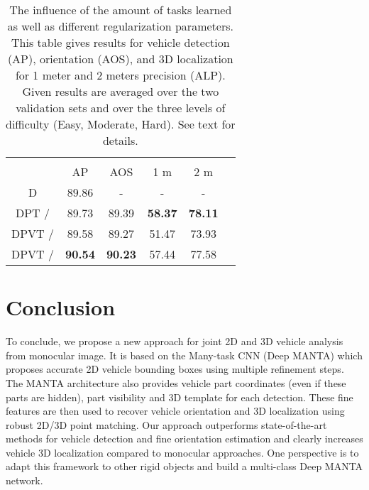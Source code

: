 \documentclass[10pt,twocolumn,letterpaper]{article}
\begin{document}
\begin{table}[ht]
\centering
\begin{tabular}{cccccc}
\multicolumn{1}{l}{}     & \multicolumn{1}{l}{}    & \multicolumn{1}{l}{}     & \multicolumn{1}{l}{}         & \multicolumn{1}{l}{}          \\ \cline{2-5} 
\multicolumn{1}{c|}{}    & \multicolumn{1}{c|}{AP} & \multicolumn{1}{c||}{AOS} &  \multicolumn{1}{c|}{1 m} & \multicolumn{1}{c|}{2 m} \\ \hline
\multicolumn{1}{|c|}{D} & \multicolumn{1}{c|}{89.86}  & \multicolumn{1}{c||}{-}   & \multicolumn{1}{c|}{-}       & \multicolumn{1}{c|}{-}        \\
\multicolumn{1}{|c|}{DPT / } & \multicolumn{1}{c|}{89.73}  & \multicolumn{1}{c||}{89.39}  & \multicolumn{1}{c|}{\textbf{58.37}}       & \multicolumn{1}{c|}{\textbf{78.11}}        \\ 
\multicolumn{1}{|c|}{DPVT / } & \multicolumn{1}{c|}{89.58}  & \multicolumn{1}{c||}{89.27}  & \multicolumn{1}{c|}{51.47}       & \multicolumn{1}{c|}{73.93}        \\ 
\multicolumn{1}{|c|}{DPVT / } & \multicolumn{1}{c|}{\textbf{90.54}}  & \multicolumn{1}{c||}{\textbf{90.23}}  & \multicolumn{1}{c|}{57.44} & \multicolumn{1}{c|}{77.58} \\ \hline
\end{tabular}
\vspace{3mm}
\caption{The influence of the amount of tasks learned as well as different regularization parameters. This table gives results for vehicle detection (AP), orientation (AOS), and 3D localization for 1 meter and 2 meters precision (ALP). Given results are averaged over the two validation sets and over the three levels of difficulty (Easy, Moderate, Hard). See text for details.}
\label{medley}
\end{table}
\section{Conclusion}
\label{sec:conclusion}
To conclude, we propose a new approach for joint 2D and 3D vehicle analysis from monocular image. It is based on the Many-task CNN (Deep MANTA) which proposes accurate 2D vehicle bounding boxes using multiple refinement steps. The MANTA architecture also provides vehicle part coordinates (even if these parts are hidden), part visibility and 3D template for each detection. These fine features are then used to recover vehicle orientation and 3D localization using robust 2D/3D point matching. Our approach outperforms state-of-the-art methods for vehicle detection and fine orientation estimation and clearly increases vehicle 3D localization compared to monocular approaches. One perspective is to adapt this framework to other rigid objects and build a multi-class Deep MANTA network.

{\small


}
\end{document}
